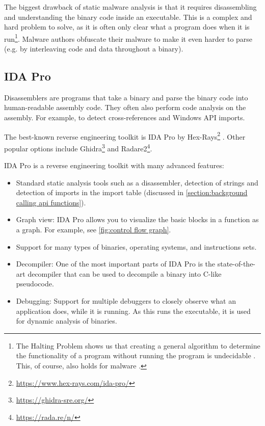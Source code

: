 The biggest drawback of static malware analysis is that it requires disassembling and understanding the binary code inside an executable. This is a complex and hard problem to solve, as it is often only clear what a program does when it is run\footnote{The Halting Problem shows us that creating a general algorithm to determine the functionality of a program without running the program is undecidable \cite{halting-problem}. This, of course, also holds for malware \cite{impossible-virus-detection}.}. Malware authors obfuscate their malware to make it even harder to parse (e.g. by interleaving code and data throughout a binary).

\subsection{IDA Pro}\label{section:ida pro}
Disassemblers are programs that take a binary and parse the binary code into human-readable assembly code. They often also perform code analysis on the assembly. For example, to detect cross-references and Windows API imports.

The best-known reverse engineering toolkit is IDA Pro by Hex-Rays\footnote{\tiny \url{https://www.hex-rays.com/ida-pro/}} \cite{ida_guide}. Other popular options include Ghidra\footnote{\tiny \url{https://ghidra-sre.org/}} and Radare2\footnote{\tiny \url{https://rada.re/n/}}.

\medskip

IDA Pro is a reverse engineering toolkit with many advanced features:
\begin{itemize}
    \item Standard static analysis tools such as a disassembler, detection of strings and detection of imports in the import table (discussed in \autoref{section:background calling api functions}).

    \item Graph view: IDA Pro allows you to visualize the basic blocks in a function as a graph. For example, see \autoref{fig:control flow graph}.

    \item Support for many types of binaries, operating systems, and instructions sets.

    \item Decompiler: One of the most important parts of IDA Pro is the state-of-the-art decompiler that can be used to decompile a binary into C-like pseudocode.

    \item Debugging: Support for multiple debuggers to closely observe what an application does, while it is running. As this runs the executable, it is used for dynamic analysis of binaries.
\end{itemize}

